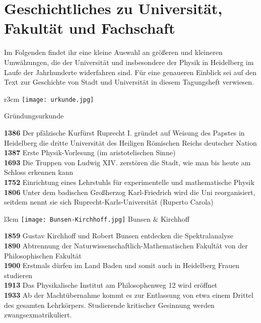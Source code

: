 
\section[Geschichtliches]{Geschichtliches zu Universität, Fakultät und Fachschaft}

Im Folgenden findet ihr eine kleine Auswahl an größeren und kleineren Umwälzungen, die der Universität und insbesondere der Physik in Heidelberg im Laufe der Jahrhunderte widerfahren sind. Für eine genaueren Einblick sei auf den Text zur Geschichte von Stadt und Universität in diesem Tagungsheft verwiesen.

\begin{wrapfigure}[]{r}{3cm}
\vspace{-13pt}
\texttt{[image: urkunde.jpg]}

\small{Gründungsurkunde}
\end{wrapfigure}

\textbf{1386} Der pfälzische Kurfürst Ruprecht I. gründet auf Weisung des Papstes in Heidelberg die dritte Universität des Heiligen Römischen Reichs deutscher Nation\\
\textbf{1387}  Erste Physik-Vorlesung (im aristotelischen Sinne)\\
\textbf{1693} Die Truppen von Ludwig XIV. zerstören die Stadt, wie man bis heute am Schloss erkennen kann\\
\textbf{1752} Einrichtung eines Lehrstuhls für experimentelle und mathematische Physik\\
\textbf{1806} Unter dem badischen Großherzog Karl-Friedrich wird die Uni reorganisiert, seitdem nennt sie sich Ruprecht-Karls-Universität (Ruperto Carola)

\begin{wrapfigure}{l}{3cm}
\vspace{-13pt}
\texttt{[image: Bunsen-Kirchhoff.jpg]}
\small{Bunsen \& Kirchhoff}
\vspace{-13pt}
\end{wrapfigure}

\textbf{1859} Gustav Kirchhoff und Robert Bunsen entdecken die Spektralanalyse\\
\textbf{1890} Abtrennung der Naturwissenschaftlich-Mathematischen Fakultät von der Philosophischen Fakultät\\
\textbf{1900} Erstmals dürfen im Land Baden und somit auch in Heidelberg Frauen studieren\\
\textbf{1913} Das Physikalische Institut am Philosophenweg 12 wird eröffnet\\
\textbf{1933} Ab der Machtübernahme kommt es zur Entlassung von etwa einem Drittel des gesamten Lehrkörpers. Studierende kritischer Gesinnung werden zwangsexmatrikuliert. 

